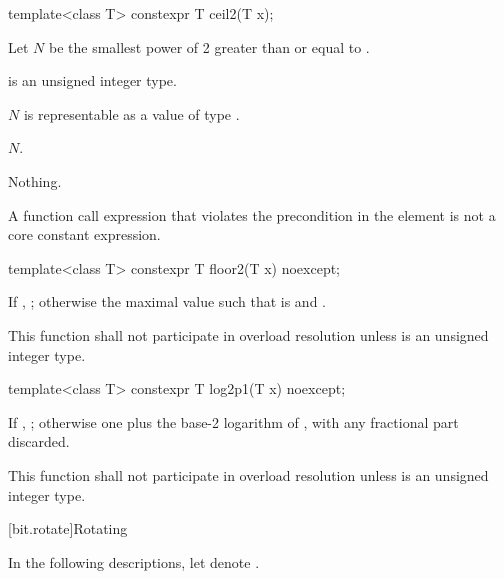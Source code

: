 %
\begin{itemdecl}
template<class T>
  constexpr T ceil2(T x);
\end{itemdecl}

\begin{itemdescr}
\pnum
Let $N$ be the smallest power of 2 greater than or equal to .

\pnum
\constraints
{} is an unsigned integer type.

\pnum
\expects
$N$ is representable as a value of type .

\pnum
\returns
$N$.

\pnum
\throws
Nothing.

\pnum
\remarks
A function call expression
that violates the precondition in the \expects element
is not a core constant expression.
\end{itemdescr}

%
\begin{itemdecl}
template<class T>
  constexpr T floor2(T x) noexcept;
\end{itemdecl}

\begin{itemdescr}
\pnum
\returns
If , ;
otherwise the maximal value 
such that  is  and .

\pnum
\remarks
This function shall not participate in overload resolution
unless  is an unsigned integer type.
\end{itemdescr}

%
\begin{itemdecl}
template<class T>
  constexpr T log2p1(T x) noexcept;
\end{itemdecl}

\begin{itemdescr}
\pnum
\returns
If , ;
otherwise one plus the base-2 logarithm of ,
with any fractional part discarded.

\pnum
\remarks
This function shall not participate in overload resolution
unless  is an unsigned integer type.
\end{itemdescr}

[bit.rotate]{Rotating}

In the following descriptions,
let  denote .


